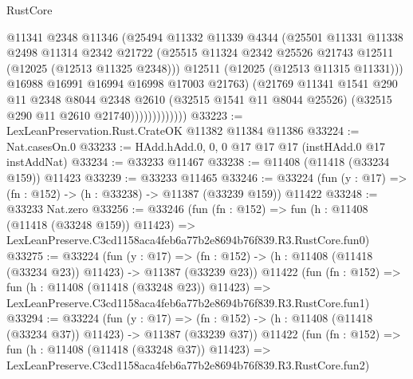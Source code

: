 \begin{lexlean}{RustCore}
\begin{coremodule}
                          @11341
                          @2348
                          @11346
                          (@25494
                            @11332
                            @11339
                            @4344
                            (@25501
                              @11331
                              @11338
                              @2498
                              @11314
                              @2342
                              @21722
                              (@25515
                                @11324
                                @2342
                                @25526
                                @21743
                                @12511
                                (@12025 (@12513 @11325 @2348)))
                              @12511
                              (@12025 (@12513 @11315 @11331)))
                            @16988
                            @16991
                            @16994
                            @16998
                            @17003
                            @21763)
                          (@21769
                            @11341
                            @1541
                            @290
                            @11
                            @2348
                            @8044
                            @2348
                            @2610
                            (@32515 @1541 @11 @8044 @25526)
                            (@32515 @290 @11 @2610 @21740)))))))))))))
@33223 := LexLeanPreservation.Rust.CrateOK @11382 @11384 @11386
@33224 := Nat.casesOn.{0}
@33233 := HAdd.hAdd.{0, 0, 0} @17 @17 @17 (instHAdd.{0} @17 instAddNat)
@33234 := @33233 @11467
@33238 := @11408 (@11418 (@33234 @159)) @11423
@33239 := @33233 @11465
@33246 := @33224 (fun (y : @17) => (fn : @152) -> (h : @33238) -> @11387 (@33239 @159)) @11422
@33248 := @33233 Nat.zero
@33256 := @33246
    (fun (fn : @152) =>
    fun (h : @11408 (@11418 (@33248 @159)) @11423) =>
    LexLeanPreserve.C3cd1158aca4feb6a77b2e8694b76f839.R3.RustCore.fun0)
@33275 := @33224
    (fun (y : @17) =>
    (fn : @152) -> (h : @11408 (@11418 (@33234 @23)) @11423) -> @11387 (@33239 @23))
    @11422
    (fun (fn : @152) =>
    fun (h : @11408 (@11418 (@33248 @23)) @11423) =>
    LexLeanPreserve.C3cd1158aca4feb6a77b2e8694b76f839.R3.RustCore.fun1)
@33294 := @33224
    (fun (y : @17) =>
    (fn : @152) -> (h : @11408 (@11418 (@33234 @37)) @11423) -> @11387 (@33239 @37))
    @11422
    (fun (fn : @152) =>
    fun (h : @11408 (@11418 (@33248 @37)) @11423) =>
    LexLeanPreserve.C3cd1158aca4feb6a77b2e8694b76f839.R3.RustCore.fun2)

\end{coremodule}
\end{lexlean}
